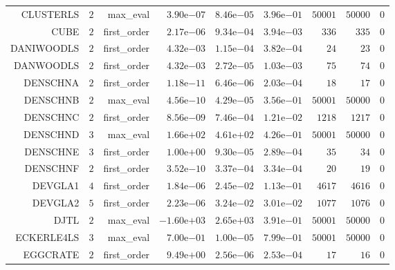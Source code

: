 \begin{longtable}{rrrrrrrrr}
CLUSTERLS & \(     2\) & max\_eval & \( 3.90\)e\(-07\) & \( 8.46\)e\(-05\) & \( 3.96\)e\(-01\) & \( 50001\) & \( 50000\) & \(     0\) \\
CUBE & \(     2\) & first\_order & \( 2.17\)e\(-06\) & \( 9.34\)e\(-04\) & \( 3.94\)e\(-03\) & \(   336\) & \(   335\) & \(     0\) \\
DANIWOODLS & \(     2\) & first\_order & \( 4.32\)e\(-03\) & \( 1.15\)e\(-04\) & \( 3.82\)e\(-04\) & \(    24\) & \(    23\) & \(     0\) \\
DANWOODLS & \(     2\) & first\_order & \( 4.32\)e\(-03\) & \( 2.72\)e\(-05\) & \( 1.03\)e\(-03\) & \(    75\) & \(    74\) & \(     0\) \\
DENSCHNA & \(     2\) & first\_order & \( 1.18\)e\(-11\) & \( 6.46\)e\(-06\) & \( 2.03\)e\(-04\) & \(    18\) & \(    17\) & \(     0\) \\
DENSCHNB & \(     2\) & max\_eval & \( 4.56\)e\(-10\) & \( 4.29\)e\(-05\) & \( 3.56\)e\(-01\) & \( 50001\) & \( 50000\) & \(     0\) \\
DENSCHNC & \(     2\) & first\_order & \( 8.56\)e\(-09\) & \( 7.46\)e\(-04\) & \( 1.21\)e\(-02\) & \(  1218\) & \(  1217\) & \(     0\) \\
DENSCHND & \(     3\) & max\_eval & \( 1.66\)e\(+02\) & \( 4.61\)e\(+02\) & \( 4.26\)e\(-01\) & \( 50001\) & \( 50000\) & \(     0\) \\
DENSCHNE & \(     3\) & first\_order & \( 1.00\)e\(+00\) & \( 9.30\)e\(-05\) & \( 2.89\)e\(-04\) & \(    35\) & \(    34\) & \(     0\) \\
DENSCHNF & \(     2\) & first\_order & \( 3.52\)e\(-10\) & \( 3.37\)e\(-04\) & \( 3.34\)e\(-04\) & \(    20\) & \(    19\) & \(     0\) \\
DEVGLA1 & \(     4\) & first\_order & \( 1.84\)e\(-06\) & \( 2.45\)e\(-02\) & \( 1.13\)e\(-01\) & \(  4617\) & \(  4616\) & \(     0\) \\
DEVGLA2 & \(     5\) & first\_order & \( 2.23\)e\(-06\) & \( 3.24\)e\(-02\) & \( 3.01\)e\(-02\) & \(  1077\) & \(  1076\) & \(     0\) \\
DJTL & \(     2\) & max\_eval & \(-1.60\)e\(+03\) & \( 2.65\)e\(+03\) & \( 3.91\)e\(-01\) & \( 50001\) & \( 50000\) & \(     0\) \\
ECKERLE4LS & \(     3\) & max\_eval & \( 7.00\)e\(-01\) & \( 1.00\)e\(-05\) & \( 7.99\)e\(-01\) & \( 50001\) & \( 50000\) & \(     0\) \\
EGGCRATE & \(     2\) & first\_order & \( 9.49\)e\(+00\) & \( 2.56\)e\(-06\) & \( 2.53\)e\(-04\) & \(    17\) & \(    16\) & \(     0\) \\

\end{longtable}
